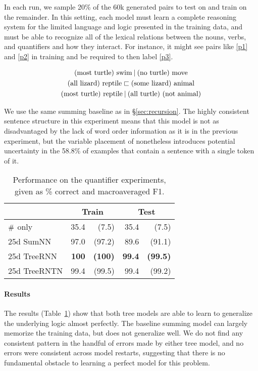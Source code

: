 In each run, we sample 20\% of the 60k generated pairs to test on and 
train on the remainder. In this setting, each model must learn a
complete reasoning system for the limited language and logic presented
in the training data, and must be able
to recognize all of the lexical relations between the nouns, verbs,
and quantifiers and how they interact. For instance, it might see
pairs like \eqref{p1} and \eqref{p2} in training and be required to 
then label \eqref{p3}.

\vspace{-0.6cm}
\begin{gather}
  \text{(most turtle) swim} \mathbin{|} \text{(no turtle) move}\label{p1}
  \\
  \text{(all lizard) reptile} \sqsubset  \text{(some lizard) animal}\label{p2}
  \\
  \text{(most turtle) reptile} \mathbin{|} \text{(all turtle) (not animal)}\label{p3}
\end{gather}

We use the same summing baseline as in \S\ref{sec:recursion}.
The highly consistent  sentence structure in this experiment means that this model
is not as disadvantaged by the lack of word order information as it is in the previous experiment, 
but the variable placement of   nonetheless introduces potential uncertainty in the 58.8\% 
of examples that contain a sentence with a single token of it.

\begin{table}[tp]
  \centering\small
    \begin{tabular}{ l r@{ \ }r r@{ \ }r }
    
    \toprule
    ~ & \multicolumn{2}{c}{Train} & \multicolumn{2}{c}{Test} \\
    \midrule
    $\mathbin{\#}$ only &	35.4 & (7.5)	& 35.4	& (7.5)\\
    25d SumNN	&	97.0&	(97.2)&	89.6&	(91.1)\\	
    25d TreeRNN	&	\textbf{100}&	\textbf{(100)}&	\textbf{99.4}&	\textbf{(99.5)}\\
    25d TreeRNTN	&	99.4&(99.5)&	99.4 & (99.2)\\
    \bottomrule
  \end{tabular}
  
  \caption{Performance on the quantifier experiments, given as \% correct and macroaveraged F1.}
  \label{qresultstable}
\end{table} 

%
%
\paragraph{Results} The results (Table~\ref{qresultstable}) show that both tree models are able to learn to generalize the underlying logic almost perfectly. The baseline summing model can largely memorize the training data, but does not generalize well. We do not find any consistent pattern in the handful of errors made by either tree model, and no errors were consistent across model restarts, suggesting that there is no fundamental obstacle to learning a perfect model for this problem.

